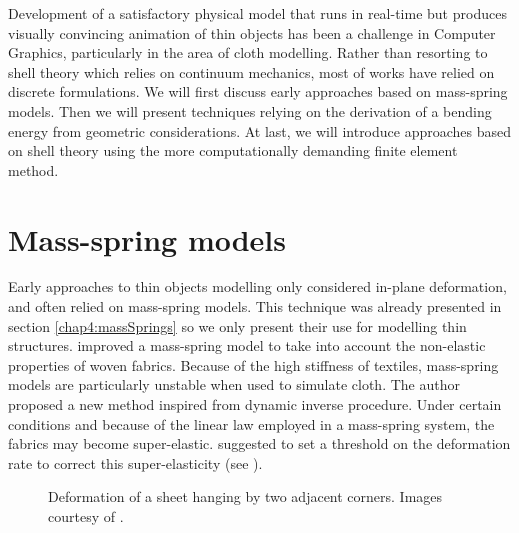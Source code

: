 Development of a satisfactory physical model that runs in real-time but produces visually convincing animation of thin objects has been a challenge in Computer Graphics, particularly in the area of cloth modelling. Rather than resorting to shell theory which relies on continuum mechanics, most of works have relied on discrete formulations. We will first discuss early approaches based on mass-spring models. Then we will present techniques relying on the derivation of a bending energy from geometric considerations. At last, we will introduce approaches based on shell theory using the more computationally demanding finite element method.

		
\section{Mass-spring models}

Early approaches to thin objects modelling only considered in-plane deformation, and often relied on mass-spring models. This technique was already presented in section \ref{chap4:massSprings} so we only present their use for modelling thin structures. \cite{Provot95} improved a mass-spring model to take into account the non-elastic properties of woven fabrics. Because of the high stiffness of textiles, mass-spring models are particularly unstable when used to simulate cloth. The author proposed a new method inspired from dynamic inverse procedure. Under certain conditions and because of the linear law employed in a mass-spring system, the fabrics may become super-elastic. \citeauthor{Provot95} suggested to set a threshold on the deformation rate to correct this super-elasticity (see ). 
%
\begin{figure}[ht]
\centering 
{}
\hfill 
{}
\hfill 
{}
\caption{Deformation of a sheet hanging by two adjacent corners. Images courtesy of \cite{Provot95}.}
\label{chap7:fig-sheet}
\end{figure}

